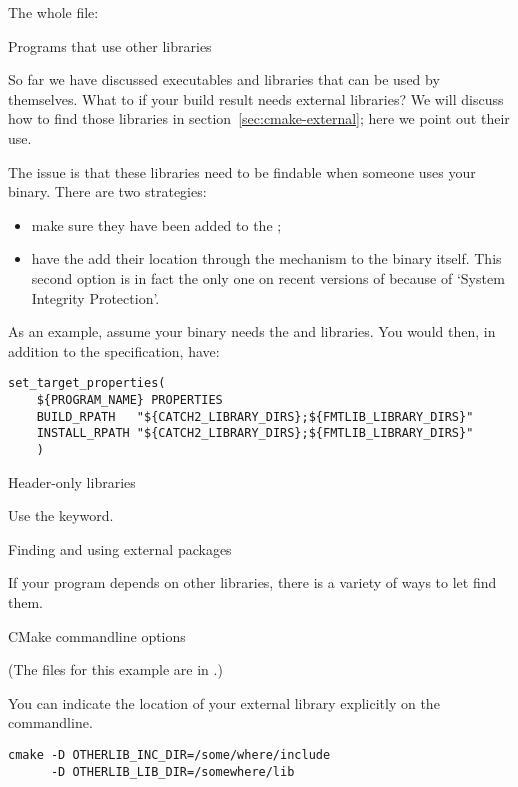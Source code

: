 The whole file:
%


\newpage
{} {Programs that use other libraries}

So far we have discussed executables and libraries that can be used by themselves.
What to if your build result needs external libraries?
We will discuss how to find those libraries in section~\ref{sec:cmake-external};
here we point out their use.

The issue is that these libraries need to be findable
when someone uses your binary. There are two strategies:
\begin{itemize}
\item make sure they have been added to the ;
\item have the  add their location through the 
  mechanism to the binary itself.
  This second option is in fact the only one on recent versions of
   because of `System Integrity Protection'.
\end{itemize}

As an example, assume your binary needs the 
and  libraries.
You would then,
in addition to the  specification,
have:
\begin{lstlisting}
set_target_properties(
	${PROGRAM_NAME} PROPERTIES
	BUILD_RPATH   "${CATCH2_LIBRARY_DIRS};${FMTLIB_LIBRARY_DIRS}"
	INSTALL_RPATH "${CATCH2_LIBRARY_DIRS};${FMTLIB_LIBRARY_DIRS}"
    )
\end{lstlisting}

 {Header-only libraries}

Use the  keyword.

 {Finding and using external packages}
\label{sec:cmake-external}

If your program depends on other libraries, there is a variety of ways
to let  find them.

 {CMake commandline options}

(The files for this example are in .)

You can indicate the location of your external library explicitly on the commandline.

\begin{lstlisting}
cmake -D OTHERLIB_INC_DIR=/some/where/include
      -D OTHERLIB_LIB_DIR=/somewhere/lib
\end{lstlisting}

